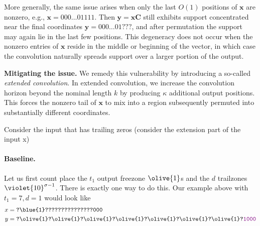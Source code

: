 More generally, the same issue arises when only the last $O(1)$ positions of $\mathbf{x}$ are nonzero, e.g., $\mathbf{x} = 000\ldots01111$.
Then $\mathbf{y} = \mathbf{x}\mathbf{C}$ still exhibits support concentrated near the final coordinates $\mathbf{y} = 000\ldots01???$, and after permutation the support may again lie in the last few positions.
This degeneracy does not occur when the nonzero entries of $\mathbf{x}$ reside in the middle or beginning of the vector, in which case the convolution naturally spreads support over a larger portion of the output.

\medskip
\noindent\textbf{Mitigating the issue.}
We remedy this vulnerability by introducing a so-called \emph{extended convolution}.
In extended convolution, we increase the convolution horizon beyond the nominal length $k$ by producing $\kappa$ additional output positions.
This forces the nonzero tail of $\mathbf{x}$ to mix into a region subsequently permuted into substantially different coordinates.


Consider the input that has trailing zeros (consider the extension part of the input x)

\paragraph{Baseline.}

Let us first count place the $t_1$  output freezone $\olive{1}$s  and the $d$ trailzones $\violet{10}^{\sigma-1}$. There is exactly one way to do this. Our example above with $t_1=7,d=1$ would look like
\begin{align*}
  x&=\texttt{?\blue{1}???????????????000}\\
  y&=\texttt{?\olive{1}?\olive{1}?\olive{1}?\olive{1}?\olive{1}?\olive{1}?\olive{1}?\textcolor{violet}{1000}}
\end{align*}
